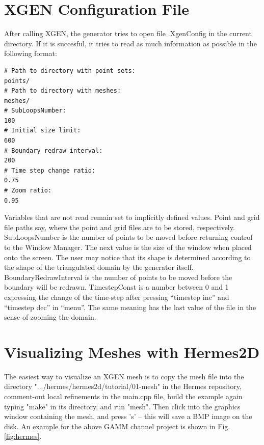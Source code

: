 \documentclass[12pt]{article}
\begin{document}
  \section{XGEN Configuration File}
   
  After calling XGEN, the generator tries to open file
  .XgenConfig in the current directory. If it is succesful,
  it tries to read as much information as possible in the
  following format:

  \begin{verbatim} 
# Path to directory with point sets:
points/
# Path to directory with meshes:
meshes/
# SubLoopsNumber:
100
# Initial size limit:
600
# Boundary redraw interval:
200
# Time step change ratio:
0.75
# Zoom ratio:
0.95
  \end{verbatim}
  Variables that are not read remain set to implicitly defined
  values. Point and grid file paths say, where the point and grid 
  files are to be stored, respectively. SubLoopsNumber is the number of
  points to be moved before returning control to the Window Manager.
  The next value is the size of the window when placed onto the screen.
  The user may notice that its shape is determined according to the shape
  of the triangulated domain by the generator itself. BoundaryRedrawInterval
  is the number of points to be moved before the boundary will be
  redrawn. TimestepConst is a number between 0 and 1 expressing the change of
  the time-step after pressing ``timestep inc'' and ``timestep dec'' in ``menu''.
  The same meaning has the last value of the file in the sense of
  zooming the domain.

  \section{Visualizing Meshes with Hermes2D}

  The easiest way to visualize an XGEN mesh is to copy the mesh file into 
  the directory ".../hermes/hermes2d/tutorial/01-mesh" in the Hermes repository, 
  comment-out local refinements
  in the main.cpp file, build the example again typing "make" in its directory, and 
  run "mesh". Then click into the graphics window containing the mesh, and press 's'
  -- this will save a BMP image on the disk. An example for the above GAMM channel
  project is shown in Fig. \ref{fig:hermes}.
\end{document}
